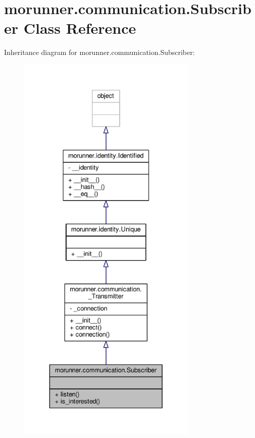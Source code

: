 \hypertarget{classmorunner_1_1communication_1_1Subscriber}{}\section{morunner.\+communication.\+Subscriber Class Reference}
\label{classmorunner_1_1communication_1_1Subscriber}


Inheritance diagram for morunner.\+communication.\+Subscriber\+:
\nopagebreak
\begin{figure}[H]
\begin{center}
\leavevmode
\includegraphics[height=550pt]{classmorunner_1_1communication_1_1Subscriber__inherit__graph}
\end{center}
\end{figure}


